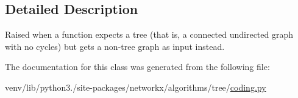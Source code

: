 \subsection{Detailed Description}
\begin{DoxyVerb}Raised when a function expects a tree (that is, a connected
undirected graph with no cycles) but gets a non-tree graph as input
instead.\end{DoxyVerb}
 

The documentation for this class was generated from the following file\+:\begin{DoxyCompactItemize}
\item 
venv/lib/python3./site-\/packages/networkx/algorithms/tree/\hyperlink{coding_8py}{coding.\+py}\end{DoxyCompactItemize}
